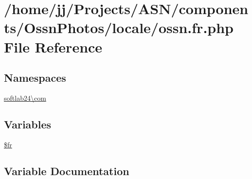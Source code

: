 \hypertarget{components_2_ossn_photos_2locale_2ossn_8fr_8php}{}\section{/home/jj/\+Projects/\+A\+S\+N/components/\+Ossn\+Photos/locale/ossn.fr.\+php File Reference}
\label{components_2_ossn_photos_2locale_2ossn_8fr_8php}
\subsection*{Namespaces}
\begin{DoxyCompactItemize}
\item 
 \hyperlink{namespacesoftlab24_1_1com}{softlab24\textbackslash{}com}
\end{DoxyCompactItemize}
\subsection*{Variables}
\begin{DoxyCompactItemize}
\item 
\hyperlink{components_2_ossn_photos_2locale_2ossn_8fr_8php_ad5107c697816e7b7f89ad1b3e94e3e0e}{\$fr}
\end{DoxyCompactItemize}


\subsection{Variable Documentation}
